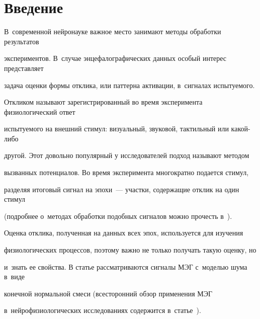 







      \thispagestyle{headings}


      







\section{Введение}










В~современной нейронауке важное место занимают методы обработки результатов 


экспериментов. В~случае энцефалографических данных особый интерес представляет 


задача оценки формы отклика, или паттерна активации, в~сигналах испытуемого. 


Откликом называют зарегистрированный во время эксперимента физиологический ответ 


испытуемого на внешний стимул: визуальный, звуковой, тактильный или ка\-кой-ли\-бо 


другой. Этот довольно популярный у исследователей подход называют методом 


вызванных потенциалов. Во время эксперимента многократно подается стимул, 


разделяя итоговый сигнал на эпохи~--- участки, содержащие отклик на один стимул 


(подробнее о~методах обработки подобных сигналов можно прочесть в~\cite{our}). 


Оценка отклика, полученная на данных всех эпох, используется для изучения 


физиологических процессов, поэтому важно не только получать такую оценку, но 


и~знать ее свойства. В статье рассматриваются сигналы МЭГ с~моделью шума в~виде 


конечной нормальной смеси (всесторонний обзор применения МЭГ 


в~нейрофизиологических исследованиях содержится в~статье~\cite{hama_main}). 


